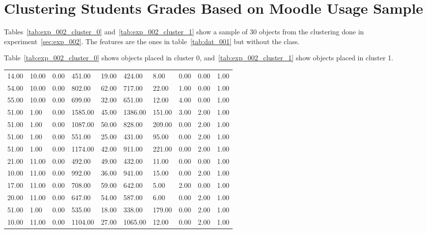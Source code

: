 \chapter{Clustering Students Grades Based on Moodle Usage Sample}
\label{attach:exp_002}

Tables~\ref{tab:exp_002_cluster_0} and~\ref{tab:exp_002_cluster_1} show a
sample of 30 objects from the clustering done in experiment~\ref{sec:exp_002}.
The features are the ones in table~\ref{tab:dat_001} but without the class.

Table~\ref{tab:exp_002_cluster_0} shows objects placed in cluster 0,
and~\ref{tab:exp_002_cluster_1} show objects placed in cluster 1.

\begin{table}[h!]
    \centering

    \begin{tabular}{| l l l l l l l l l l |}
        \hline
        14.00 & 10.00 & 0.00 & 451.00 & 19.00 & 424.00 & 8.00 & 0.00 & 0.00 & 1.00 \\
        54.00 & 10.00 & 0.00 & 802.00 & 62.00 & 717.00 & 22.00 & 1.00 & 0.00 & 1.00 \\
        55.00 & 10.00 & 0.00 & 699.00 & 32.00 & 651.00 & 12.00 & 4.00 & 0.00 & 1.00 \\
        51.00 & 1.00 & 0.00 & 1585.00 & 45.00 & 1386.00 & 151.00 & 3.00 & 2.00 & 1.00 \\
        51.00 & 1.00 & 0.00 & 1087.00 & 50.00 & 828.00 & 209.00 & 0.00 & 2.00 & 1.00 \\
        51.00 & 1.00 & 0.00 & 551.00 & 25.00 & 431.00 & 95.00 & 0.00 & 2.00 & 1.00 \\
        51.00 & 1.00 & 0.00 & 1174.00 & 42.00 & 911.00 & 221.00 & 0.00 & 2.00 & 1.00 \\
        21.00 & 11.00 & 0.00 & 492.00 & 49.00 & 432.00 & 11.00 & 0.00 & 0.00 & 1.00 \\
        10.00 & 11.00 & 0.00 & 992.00 & 36.00 & 941.00 & 15.00 & 0.00 & 2.00 & 1.00 \\
        17.00 & 11.00 & 0.00 & 708.00 & 59.00 & 642.00 & 5.00 & 2.00 & 0.00 & 1.00 \\
        20.00 & 11.00 & 0.00 & 647.00 & 54.00 & 587.00 & 6.00 & 0.00 & 2.00 & 1.00 \\
        51.00 & 1.00 & 0.00 & 535.00 & 18.00 & 338.00 & 179.00 & 0.00 & 2.00 & 1.00 \\
        10.00 & 11.00 & 0.00 & 1104.00 & 27.00 & 1065.00 & 12.00 & 0.00 & 2.00 & 1.00 \\

\end{tabular}
\end{table}
